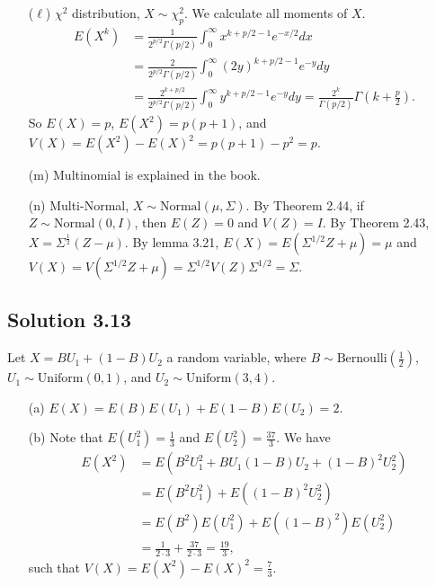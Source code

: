 \begin{itemize}
\item[($\ell$)] $\chi^2$ distribution, $X \sim \chi^2_p$.
We calculate all moments of $X$.
\begin{equation*}
\begin{split}
E(X^k) &= \frac{1}{2^{p/2} \Gamma(p/2)} \int_0^{\infty} x^{k + p/2 - 1} e^{-x/2} dx \\
    &= \frac{2}{2^{p/2} \Gamma(p/2)} \int_0^{\infty} (2y)^{k + p/2 - 1} e^{-y} dy \\
    &= \frac{2^{k + p/2}}{2^{p/2} \Gamma(p/2)} \int_0^{\infty} y^{k + p/2 - 1} e^{-y} dy
    = \frac{2^{k}}{\Gamma(p/2)} \Gamma\left(k + \frac{p}{2}\right).
\end{split}
\end{equation*}
So $E(X) = p$, $E(X^2) = p(p + 1)$, and $V(X) = E(X^2) - E(X)^2 = p(p + 1) - p^2 = p$.

\item[(m)] Multinomial is explained in the book.

\item[(n)] Multi-Normal, $X \sim \mathrm{Normal}(\mu, \Sigma)$.
By Theorem 2.44, if $Z \sim \mathrm{Normal}(0, I)$, then $E(Z) = 0$ and $V(Z) = I$.
By Theorem 2.43, $X = \Sigma^{\frac{1}{2}} (Z - \mu)$.
By lemma 3.21, $E(X) = E(\Sigma^{1/2}Z + \mu) = \mu$ and $V(X) = V(\Sigma^{1/2}Z + \mu) = \Sigma^{1/2} V(Z) \Sigma^{1/2} = \Sigma$.

\end{itemize}


\subsection*{Solution 3.13}

Let $X = B U_1 + (1 - B) U_2$ a random variable, where $B \sim \mathrm{Bernoulli}(\frac{1}{2})$, $U_1 \sim \mathrm{Uniform}(0, 1)$, and $U_2 \sim \mathrm{Uniform}(3, 4)$.

\begin{itemize}
    \item[(a)] $E(X) = E(B)E(U_1) + E(1-B)E(U_2) = 2$.
    \item[(b)] Note that $E(U_1^2) = \frac{1}{3}$ and $E(U_2^2) = \frac{37}{3}$.
        We have
        \begin{equation*}
            \begin{split}
                E(X^2) &= E(B^2 U_1^2 + B U_1 (1 - B) U_2 + (1 - B)^2 U_2^2) \\
                    &= E(B^2 U_1^2) + E((1 - B)^2 U_2^2) \\
                    &= E(B^2) E(U_1^2) + E((1 - B)^2) E(U_2^2) \\
                    &= \frac{1}{2 \cdot 3} + \frac{37}{2 \cdot 3}
                    = \frac{19}{3},
            \end{split}
        \end{equation*}
        such that $V(X) = E(X^2) - E(X)^2 = \frac{7}{3}$.
\end{itemize}


